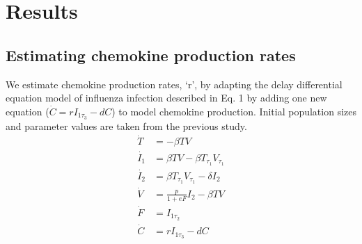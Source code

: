 \documentclass[10pt]{article}
\newcommand{\removed}[1]{{\color{dkred}\sout{#1}}}
\newcommand{\fred}[1]{{\color{dkblue}#1}}
\begin{document}
%



\section{Results}

\subsection{Estimating chemokine production rates}

We estimate chemokine production rates, `r', by adapting the delay differential equation model of influenza infection described in \cite{Mitchell2011} Eq. 1 by adding one new equation ($\dot{C}=r I_{1 \tau_3}-dC$) to model chemokine production.  Initial population sizes and parameter values are taken from the previous study.
{\footnotesize
\begin{equation}
\begin{aligned}
\dot{T} &= - \beta T V \\
\dot{I_1} &= \beta T V - \beta T_{\tau_1}V_{\tau_1} \\
\dot{I_2} &= \beta T_{\tau_1}V_{\tau_1} - \delta I_2 \\
\dot{V} &= \frac{p}{1+eF} I_2  - \beta T V  \\
\dot{F} &=  I_{1 \tau_2} \\
\dot{C} &= r I_{1 \tau_3} - d C \\
\end{aligned}
\label{eq:dde}
\end{equation}
\vspace{.05in}
}
\end{document}
